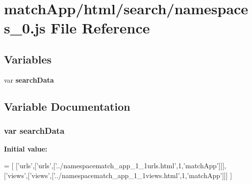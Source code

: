 \section{match\+App/html/search/namespaces\+\_\+0.js File Reference}
\label{namespaces__0_8js}
\subsection*{Variables}
\begin{DoxyCompactItemize}
\item 
var {\bf search\+Data}
\end{DoxyCompactItemize}


\subsection{Variable Documentation}
\subsubsection[{search\+Data}]{\setlength{\rightskip}{0pt plus 5cm}var search\+Data}\label{namespaces__0_8js_ad01a7523f103d6242ef9b0451861231e}
{\bfseries Initial value\+:}
\begin{DoxyCode}
=
[
  [\textcolor{stringliteral}{'urls'},[\textcolor{stringliteral}{'urls'},[\textcolor{stringliteral}{'../namespacematch\_app\_1\_1urls.html'},1,\textcolor{stringliteral}{'matchApp'}]]],
  [\textcolor{stringliteral}{'views'},[\textcolor{stringliteral}{'views'},[\textcolor{stringliteral}{'../namespacematch\_app\_1\_1views.html'},1,\textcolor{stringliteral}{'matchApp'}]]]
]
\end{DoxyCode}
